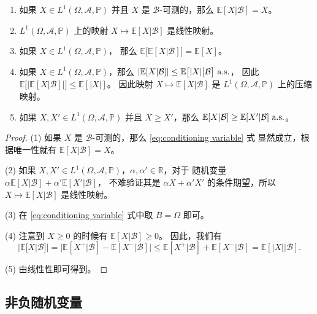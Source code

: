 \begin{proposition}[条件期望的性质]
  \mbox{}
  \begin{enumerate}
    \item 如果 $X\in L^1(\Omega,\mathcal{A},\mathbb{P})$
    并且 $X$ 是 $\mathcal{B}$-可测的，那么
    $\mathbb{E}[X|\mathcal{B}]=X$。
    \item $L^1(\Omega,\mathcal{A},\mathbb{P})$
    上的映射 $X\mapsto \mathbb{E}[X| \mathcal{B}]$
    是线性映射。
    \item 如果 $X\in L^1(\Omega,\mathcal{A},\mathbb{P})$，
    那么 $\mathbb{E}\bigl[\mathbb{E}[X| \mathcal{B}]\bigr]=\mathbb{E}[X]$。
    \item 如果 $X\in L^1(\Omega,\mathcal{A},\mathbb{P})$，那么
    $|\mathbb{E}[X|\mathcal{B}]|\leq \mathbb{E}\bigl[|X|\big| \mathcal{B}\bigr]\text{$$ a.s.}$，
    因此 $\mathbb{E}\bigl[\bigl|\mathbb{E}[X|\mathcal{B}]\bigr|\bigr]\leq \mathbb{E}[|X|]$。
    因此映射 $X\mapsto \mathbb{E}[X|\mathcal{B}]$ 是 $L^1(\Omega,\mathcal{A},\mathbb{P})$
    上的压缩映射。
    \item 如果 $X,X'\in L^1(\Omega,\mathcal{A},\mathbb{P})$ 并且
    $X\geq X'$，那么 $\mathbb{E}[X|\mathcal{B}]\geq \mathbb{E}[X'|\mathcal{B}]\text{$$ a.s.}$。
  \end{enumerate}
\end{proposition}
\begin{proof}
  (1) 如果 $X$ 是 $\mathcal{B}$-可测的，那么 \eqref{eq:conditioning variable} 式
  显然成立，根据唯一性就有 $\mathbb{E}[X|\mathcal{B}]=X$。

  (2) 如果 $X,X'\in L^1(\Omega,\mathcal{A},\mathbb{P})$，$\alpha,\alpha'\in \mathbb{R}$，对于
  随机变量 $\alpha \mathbb{E}[X|\mathcal{B}]+\alpha' \mathbb{E}[X'|\mathcal{B}]$，
  不难验证其是 $\alpha X+\alpha' X'$ 的条件期望，所以 $X\mapsto \mathbb{E}[X|\mathcal{B}]$
  是线性映射。

  (3) 在 \eqref{eq:conditioning variable} 式中取 $B=\Omega$ 即可。

  (4) 注意到 $X\geq 0$ 的时候有 $\mathbb{E}[X|\mathcal{B}]\geq 0$。
  因此，我们有
  \[
    |\mathbb{E}[X|\mathcal{B}]|=\bigl|
      \mathbb{E}[X^+|\mathcal{B}]-\mathbb{E}[X^-|\mathcal{B}]
    \bigr|\leq 
    \mathbb{E}[X^+|\mathcal{B}]+\mathbb{E}[X^-|\mathcal{B}]=
    \mathbb{E}[|X|\big| \mathcal{B}].
  \]
  
  (5) 由线性性即可得到。
\end{proof}

\subsection{非负随机变量}

